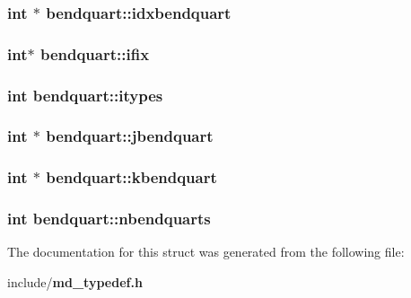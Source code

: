 \subsubsection{\setlength{\rightskip}{0pt plus 5cm}int $\ast$ {\bf bendquart::idxbendquart}}\label{structbendquart_baede2feb22c2590b2ed29ff5b441753}


\subsubsection{\setlength{\rightskip}{0pt plus 5cm}int$\ast$ {\bf bendquart::ifix}}\label{structbendquart_77b265ed9506ec017f0f3fb34b82de9c}


\subsubsection{\setlength{\rightskip}{0pt plus 5cm}int {\bf bendquart::itypes}}\label{structbendquart_38237144d2f798145d033cb2c1c3fa5b}


\subsubsection{\setlength{\rightskip}{0pt plus 5cm}int $\ast$ {\bf bendquart::jbendquart}}\label{structbendquart_4fca1814e644b8b38fa2c4cb9f183bed}


\subsubsection{\setlength{\rightskip}{0pt plus 5cm}int $\ast$ {\bf bendquart::kbendquart}}\label{structbendquart_e39e5ef153df97c0a48130696aba452f}


\subsubsection{\setlength{\rightskip}{0pt plus 5cm}int {\bf bendquart::nbendquarts}}\label{structbendquart_3983995ad16dea8277b2ddefdef9da27}




The documentation for this struct was generated from the following file:\begin{CompactItemize}
\item 
include/{\bf md\_\-typedef.h}\end{CompactItemize}
